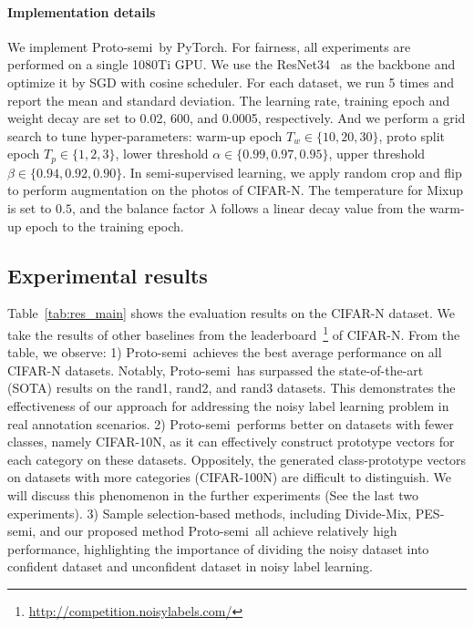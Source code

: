 \documentclass[letterpaper]{article} %
\newcommand{\method}{Proto-semi}
\begin{document}
\paragraph{Implementation details}
We implement \method\ by PyTorch. For fairness, all experiments are performed on a single 1080Ti GPU. We use the ResNet34~\cite{DBLP:conf/cvpr/HeZRS16} as the backbone and optimize it by SGD with cosine scheduler.
For each dataset, we run 5 times and report the mean and standard deviation. The learning rate, training epoch and weight decay are set to 0.02, 600, and 0.0005, respectively. And we perform a grid search to tune hyper-parameters: warm-up epoch $T_w \in \{10, 20, 30\}$, proto split epoch $T_p \in \{1, 2, 3\}$, lower threshold $\alpha \in \{0.99, 0.97, 0.95\}$, upper threshold $\beta \in \{0.94, 0.92, 0.90\}$. In semi-supervised learning, we apply random crop and flip to perform augmentation on the photos of CIFAR-N. The temperature for Mixup is set to $0.5$, and the balance factor $\lambda$ follows a linear decay value from the warm-up epoch to the training epoch.



\subsection{Experimental results}
Table~\ref{tab:res_main} shows the evaluation results on the CIFAR-N dataset. We take the results of other baselines from the leaderboard~\footnote{\url{http://competition.noisylabels.com/}} of CIFAR-N.
From the table, we observe: 1) \method\ achieves the best average performance on all CIFAR-N datasets. Notably, \method\ has surpassed the state-of-the-art (SOTA) results on the rand1, rand2, and rand3 datasets. This demonstrates the effectiveness of our approach for addressing the noisy label learning problem in real annotation scenarios.
2) \method\ performs better on datasets with fewer classes, namely CIFAR-10N, as it can effectively construct prototype vectors for each category on these datasets.
Oppositely, the generated class-prototype vectors on datasets with more categories (CIFAR-100N) are difficult to distinguish. We will discuss this phenomenon in the further experiments (See the last two experiments).
3) Sample selection-based methods, including Divide-Mix, PES-semi, and our proposed method \method\ all achieve relatively high performance, highlighting the importance of dividing the noisy dataset into confident dataset and unconfident dataset in noisy label learning.
\end{document}
